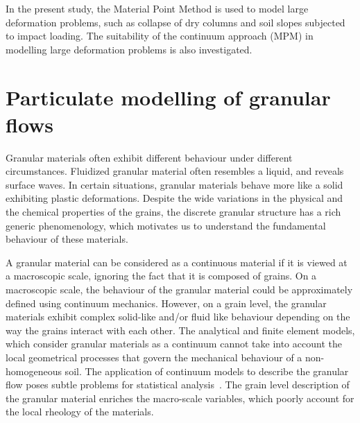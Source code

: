 In the present study, the Material Point Method is used to model large 
deformation problems, such as collapse of dry columns and soil slopes subjected 
to impact loading. The suitability of the continuum approach (MPM) in modelling 
large deformation problems is also investigated.

\section{Particulate modelling of granular flows}

Granular materials often exhibit different behaviour under different 
circumstances. Fluidized granular material often resembles a liquid, and 
reveals surface waves. In certain situations, granular materials behave more 
like a solid exhibiting plastic deformations. Despite the wide variations in 
the physical and the chemical properties of the grains, the discrete granular 
structure has a rich generic phenomenology, which motivates us to understand 
the fundamental behaviour of these materials. 

A granular material can be 
considered as a continuous material if it is viewed at a macroscopic scale, 
ignoring the fact that it is composed of grains. On a macroscopic scale, the 
behaviour of the granular material could be approximately defined using 
continuum mechanics. However, on a grain level, the granular materials 
exhibit complex solid-like and/or fluid like behaviour depending on the way the 
grains interact with each other. The analytical and finite element models, 
which consider granular materials as a continuum cannot take into account the 
local geometrical processes that govern the mechanical behaviour of a 
non-homogeneous soil. The application of continuum models to describe the 
granular flow poses subtle problems for statistical analysis~\citep{Mehta1994}. 
The grain level description of the granular material enriches the macro-scale 
variables, which poorly account for the local rheology of the materials. 

